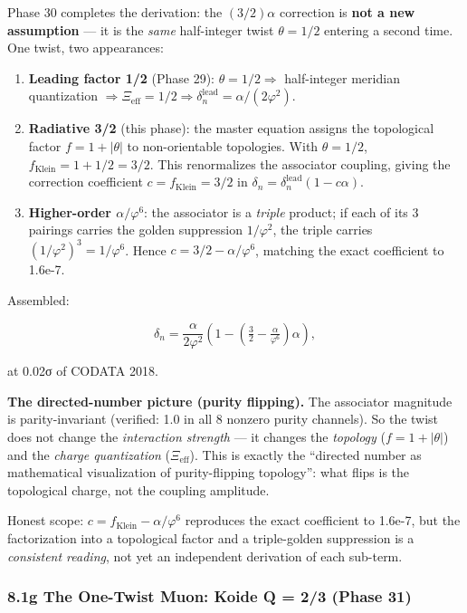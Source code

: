 \documentclass[
]{article}
\providecommand{\tightlist}{%
  \setlength{\itemsep}{0pt}\setlength{\parskip}{0pt}}
\begin{document}
Phase 30 completes the derivation: the \((3/2)\alpha\) correction is
\textbf{not a new assumption} --- it is the \emph{same} half-integer
twist \(\theta = 1/2\) entering a second time. One twist, two
appearances:

\begin{enumerate}
\def\labelenumi{\arabic{enumi}.}
\tightlist
\item
  \textbf{Leading factor 1/2} (Phase 29): \(\theta = 1/2 \Rightarrow\)
  half-integer meridian quantization
  \(\Rightarrow \Xi_{\text{eff}} = 1/2 \Rightarrow \delta_n^{\text{lead}} = \alpha/(2\varphi^2)\).
\item
  \textbf{Radiative 3/2} (this phase): the master equation assigns the
  topological factor \(f = 1 + |\theta|\) to non-orientable topologies.
  With \(\theta = 1/2\), \(f_{\text{Klein}} = 1 + 1/2 = 3/2\). This
  renormalizes the associator coupling, giving the correction
  coefficient \(c = f_{\text{Klein}} = 3/2\) in
  \(\delta_n = \delta_n^{\text{lead}}(1 - c\alpha)\).
\item
  \textbf{Higher-order \(\alpha/\varphi^6\)}: the associator is a
  \emph{triple} product; if each of its 3 pairings carries the golden
  suppression \(1/\varphi^2\), the triple carries
  \((1/\varphi^2)^3 = 1/\varphi^6\). Hence
  \(c = 3/2 - \alpha/\varphi^6\), matching the exact coefficient to
  1.6e-7.
\end{enumerate}

Assembled:

\[\delta_n = \frac{\alpha}{2\varphi^2}\left(1 - \left(\tfrac{3}{2} - \tfrac{\alpha}{\varphi^6}\right)\alpha\right),\]

at 0.02σ of CODATA 2018.

\textbf{The directed-number picture (purity flipping).} The associator
magnitude is parity-invariant (verified: 1.0 in all 8 nonzero purity
channels). So the twist does not change the \emph{interaction strength}
--- it changes the \emph{topology} (\(f = 1 + |\theta|\)) and the
\emph{charge quantization} (\(\Xi_{\text{eff}}\)). This is exactly the
``directed number as mathematical visualization of purity-flipping
topology'': what flips is the topological charge, not the coupling
amplitude.

Honest scope: \(c = f_{\text{Klein}} - \alpha/\varphi^6\) reproduces the
exact coefficient to 1.6e-7, but the factorization into a topological
factor and a triple-golden suppression is a \emph{consistent reading},
not yet an independent derivation of each sub-term.

\subsubsection{8.1g The One-Twist Muon: Koide Q = 2/3 (Phase
31)}\label{g-the-one-twist-muon-koide-q-23-phase-31}
\end{document}

